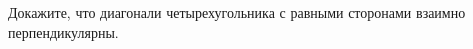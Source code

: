 \begin{ex}
	\begin{condition}
		Докажите, что диагонали четырехугольника с равными сторонами взаимно перпендикулярны.
	\end{condition}
\end{ex}